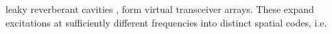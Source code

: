 leaky reverberant cavities
\cite{article:FromentezeOptExp2017,article:FromentezeApplPhysLett2015}, form
virtual transceiver arrays.
These expand
excitations at
sufficiently different frequencies into
distinct spatial codes, i.e.
